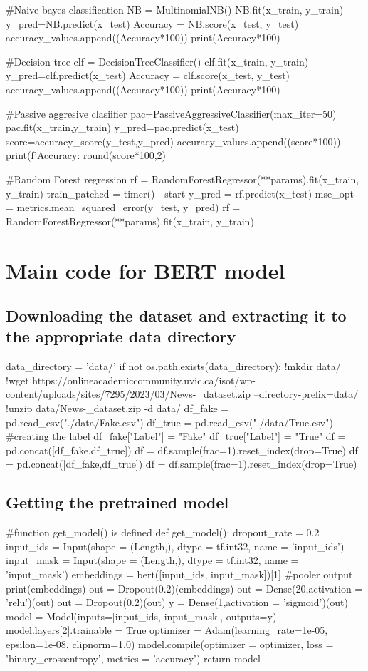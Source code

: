 \documentclass{josis}
\begin{document}
{{\begin{python}
#Naive bayes classification
NB = MultinomialNB()
NB.fit(x_train, y_train)
y_pred=NB.predict(x_test)
Accuracy = NB.score(x_test, y_test)
accuracy_values.append((Accuracy*100))
print(Accuracy*100)
 
#Decision tree
clf = DecisionTreeClassifier()
clf.fit(x_train, y_train)
y_pred=clf.predict(x_test)
Accuracy = clf.score(x_test, y_test)
accuracy_values.append((Accuracy*100))
print(Accuracy*100)

#Passive aggresive clasiifier
pac=PassiveAggressiveClassifier(max_iter=50)
pac.fit(x_train,y_train)
y_pred=pac.predict(x_test)
score=accuracy_score(y_test,y_pred)
accuracy_values.append((score*100))
print(f'Accuracy: {round(score*100,2)}%

#Random Forest regression
rf = RandomForestRegressor(**params).fit(x_train, y_train)
train_patched = timer() - start
y_pred = rf.predict(x_test)
mse_opt = metrics.mean_squared_error(y_test, y_pred)
rf = RandomForestRegressor(**params).fit(x_train, y_train)
\end{python}
\section{  Main code for BERT model}
\subsection{Downloading the dataset and extracting it to the appropriate data directory}
\begin{python}
data_directory = 'data/'
if not os.path.exists(data_directory):
!mkdir data/
!wget https://onlineacademiccommunity.uvic.ca/isot/wp-content/uploads/sites/7295/2023/03/News-_dataset.zip --directory-prefix=data/
!unzip data/News-_dataset.zip -d data/
df_fake = pd.read_csv("./data/Fake.csv")
df_true = pd.read_csv("./data/True.csv")
#creating the label
df_fake["Label"] = "Fake"
df_true["Label"] = "True"
df = pd.concat([df_fake,df_true])
df = df.sample(frac=1).reset_index(drop=True)
df = pd.concat([df_fake,df_true])
df = df.sample(frac=1).reset_index(drop=True)
\end{python}
\subsection{Getting the pretrained model}
\begin{python}
#function get_model() is defined
def get_model():
   dropout_rate = 0.2
   input_ids = Input(shape = (Length,), dtype = tf.int32, name = 'input_ids')
   input_mask = Input(shape = (Length,), dtype = tf.int32, name = 'input_mask')
   embeddings = bert([input_ids, input_mask])[1] #pooler output
   print(embeddings)
   out = Dropout(0.2)(embeddings)
   out = Dense(20,activation = 'relu')(out)
   out = Dropout(0.2)(out)
   y = Dense(1,activation = 'sigmoid')(out)
   model = Model(inputs=[input_ids, input_mask], outputs=y)
   model.layers[2].trainable = True
   optimizer = Adam(learning_rate=1e-05, epsilon=1e-08, clipnorm=1.0)
   model.compile(optimizer = optimizer, loss = 'binary_crossentropy', metrics = 'accuracy')
   return model
\end{python}
  
}}
\end{document}
